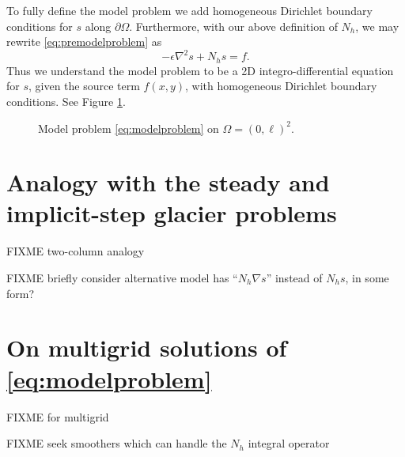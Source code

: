 \documentclass[letterpaper,final,12pt,reqno]{amsart}
\theoremstyle{cstyle}
\theoremstyle{cstyle*}
\theoremstyle{dstyle}
\numberwithin{equation}{section}
\newcommand{\eps}{\epsilon}
\newcommand{\grad}{\nabla}
\begin{document}
To fully define the model problem we add homogeneous Dirichlet boundary conditions for $s$ along $\partial \Omega$.  Furthermore, with our above definition of $N_h$, we may rewrite \eqref{eq:premodelproblem} as
\begin{equation}
-\eps \grad^2 s + N_h s = f.  \label{eq:modelproblem}
\end{equation}
Thus we understand the model problem to be a 2D integro-differential equation for $s$, given the source term $f(x,y)$, with homogeneous Dirichlet boundary conditions.  See Figure \ref{fig:modelproblem}.

\begin{figure}
\caption{Model problem \eqref{eq:modelproblem} on $\Omega = (0,\ell)^2$.}
\label{fig:modelproblem}
\end{figure}


\section{Analogy with the steady and implicit-step glacier problems} \label{sec:analogy}

FIXME two-column analogy

FIXME briefly consider alternative model has ``$N_h \grad s$'' instead of $N_h s$, in some form?


\section{On multigrid solutions of \eqref{eq:modelproblem}} \label{sec:numerical}

FIXME \cite{Briggsetal2000,Bueler2021,Trottenbergetal2001} for multigrid

FIXME seek smoothers which can handle the $N_h$ integral operator
\end{document}
